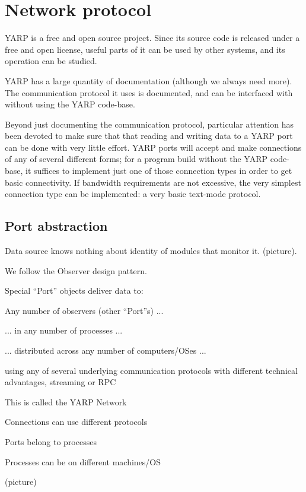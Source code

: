 
\section{Network protocol}

YARP is a free and open source project.  Since its source code is
released under a free and open license, useful parts of it can be used
by other systems, and its operation can be studied.

YARP has a large quantity of documentation (although we always need
more).  The communication protocol it uses is documented, and can be
interfaced with without using the YARP code-base.

Beyond just documenting the communication protocol, particular attention
has been devoted to make sure that that reading and writing data to a
YARP port can be done with very little effort.  YARP ports will 
accept and make connections of any of several different forms;
for a program build without the YARP code-base, it suffices
to implement just one of those connection types in order to
get basic connectivity.  If bandwidth requirements are not
excessive, the very simplest connection type can be implemented:
a very basic text-mode protocol.



\subsection{Port abstraction}

Data source knows nothing about identity of modules that monitor it.
(picture).

We follow the Observer design pattern. 

Special ``Port'' objects deliver data to:

Any number of observers (other ``Port''s) ...

... in any number of processes ...

... distributed across any number of computers/OSes ...

using any of several underlying communication protocols with different
technical advantages, streaming or RPC

This is called the YARP Network

Connections can use different protocols

Ports belong to processes

Processes can be on different machines/OS

(picture)

